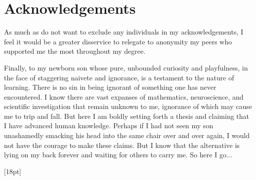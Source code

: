 \documentclass[11pt]{report}
\begin{document}
\newpage
\chapter*{Acknowledgements}
As much as do not want to exclude any individuals in my acknowledgements, I feel it would be a greater disservice to relegate to anonymity my peers who supported me the most throughout my degree.

Finally, to my newborn son whose pure, unbounded curiosity and playfulness, in the face of staggering naivete and ignorance, is a testament to the nature of learning. There is no sin in being ignorant of something one has never encountered. I know there are vast expanses of mathematics, neuroscience, and scientific investigation that remain unknown to me, ignorance of which may cause me to trip and fall. But here I am boldly setting forth a thesis and claiming that I have advanced human knowledge. Perhaps if I had not seen my son unashamedly smacking his head into the same chair over and over again, I would not have the courage to make these claims. But I know that the alternative is lying on my back forever and waiting for others to carry me. So here I go...


\newpage


\newpage



\newpage

\renewcommand*\contentsname{\color{seccolor}Table of contents}
[18pt]{\addvspace{3pt}}{\thecontentslabel\enspace}{}{\contentspage}
\tableofcontents

\newpage

\renewcommand{\chaptermark}[1]{\markboth{#1}{#1}}
\fancyhead[R]{}
\fancyhead[L]{{\color{gray}\textit{\chaptername\ \thechapter}\ --\ \leftmark}}

\setcounter{page}{1}

\renewcommand{\thefootnote}{\fnsymbol{footnote}}
\hypersetup{linkcolor=seccolor}



% 

% 

% 
\end{document}
